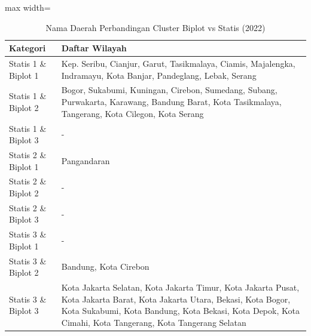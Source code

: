 \begin{table}[H]
\centering
\caption{Nama Daerah Perbandingan Cluster Biplot vs Statis (2022)} \label{tab:appbiplot_statis_name_2022}
\begin{adjustbox}{max width=\textwidth}
\begin{tabular}{|p{4cm}|p{10cm}|}
\hline
\textbf{Kategori} & \textbf{Daftar Wilayah} \\
\hline
Statis 1 \& Biplot 1 & Kep. Seribu, Cianjur, Garut, Tasikmalaya, Ciamis, Majalengka, Indramayu, Kota Banjar, Pandeglang, Lebak, Serang \\
\hline
Statis 1 \& Biplot 2 & Bogor, Sukabumi, Kuningan, Cirebon, Sumedang, Subang, Purwakarta, Karawang, Bandung Barat, Kota Tasikmalaya, Tangerang, Kota Cilegon, Kota Serang \\
\hline
Statis 1 \& Biplot 3 & - \\
\hline
Statis 2 \& Biplot 1 & Pangandaran \\
\hline
Statis 2 \& Biplot 2 & - \\
\hline
Statis 2 \& Biplot 3 & - \\
\hline
Statis 3 \& Biplot 1 & - \\
\hline
Statis 3 \& Biplot 2 & Bandung, Kota Cirebon \\
\hline
Statis 3 \& Biplot 3 & Kota Jakarta Selatan, Kota Jakarta Timur, Kota Jakarta Pusat, Kota Jakarta Barat, Kota Jakarta Utara, Bekasi, Kota Bogor, Kota Sukabumi, Kota Bandung, Kota Bekasi, Kota Depok, Kota Cimahi, Kota Tangerang, Kota Tangerang Selatan \\
\hline
\end{tabular}
\end{adjustbox}
\end{table}